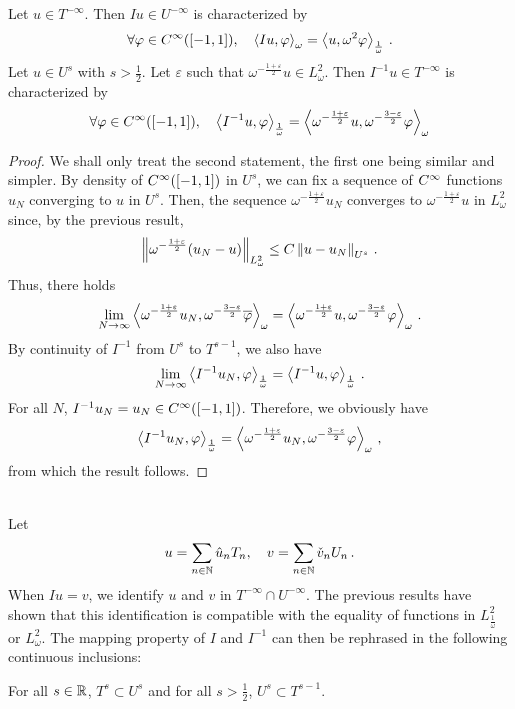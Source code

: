 \documentclass[a4paper]{article}
\begin{document}
\begin{Cor}
	Let $u \in T^{-\infty}$. Then $Iu \in U^{-\infty}$ is characterized by
	\[\forall \varphi\in C^{\infty}([-1,1]),\quad \left\langle Iu,\varphi\right\rangle_\omega = \left\langle u,\omega^2 \varphi\right\rangle_\frac{1}{\omega}\,.\]
	Let $u \in U^s$ with $s > \frac{1}{2}$. Let $\varepsilon$ such that $\omega^{-\frac{1+ \varepsilon}{2} }u \in L^2_\omega$. Then $I^{-1}u \in T^{-\infty}$ is characterized by 
	\[\forall \varphi\in C^{\infty}([-1,1]), \quad \left\langle I^{-1}u,\varphi\right\rangle_\frac{1}{\omega}=\left\langle {\omega^{-\frac{1+ \varepsilon}{2} }u},{\omega^{-\frac{3- \varepsilon}{2} } \varphi}\right\rangle_\omega \]
\end{Cor}
\begin{proof}
	We shall only treat the second statement, the first one being similar and simpler. By density of $C^{\infty}([-1,1])$ in $U^s$, we can fix a sequence of $C^{\infty}$ functions $u_N$ converging to $u$ in $U^s$. Then, the sequence $\omega^{-\frac{1 + \varepsilon}{2}}u_N$ converges to $\omega^{-\frac{1 + \varepsilon}{2}}u$ in $L^2_\omega$ since, by the previous result,
	\[\left\|\omega^{-\frac{1+ \varepsilon}{2}}(u_N - u)\right\|_{L^2_\omega} \leq C \left\|u - u_N\right\|_{U^{s}}\,.\]
	Thus, there holds 
	\[\lim_{N \to \infty} \left\langle {\omega^{-\frac{1+ \varepsilon}{2} }u_N},{\omega^{-\frac{3- \varepsilon}{2} }\overline \varphi}\right\rangle_\omega = \left\langle {\omega^{-\frac{1+ \varepsilon}{2} }u},{\omega^{-\frac{3- \varepsilon}{2} } \varphi}\right\rangle_\omega\,.\]
	By continuity of $I^{-1}$ from $U^s$ to $T^{s - 1}$, we also have 
	\[\lim_{N \to \infty}\left\langle I^{-1} u_N,\varphi\right\rangle_{\frac{1}{\omega}} = \left\langle I^{-1} u,\varphi\right\rangle_{\frac{1}{\omega}}\,. \]
	For all $N$, $I^{-1}u_N = u_N \in C^{\infty}([-1,1])$. Therefore, we obviously have
	\[\left\langle I^{-1}u_N,\varphi\right\rangle_{\frac{1}{\omega}} =  \left\langle {\omega^{-\frac{1+ \varepsilon}{2} }u_N},{\omega^{-\frac{3- \varepsilon}{2} } \varphi}\right\rangle_\omega\,,\] 
	from which the result follows.
\end{proof}
\noindent{}\\
\noindent Let
\[u = \sum_{n \in \mathbb{N} } \hat{u}_n T_n, \quad v = \sum_{n \in \mathbb{N}} \check{v}_n U_n\,.\]
When $Iu = v$, we identify $u$ and $v$ in $T^{-\infty} \cap U^{-\infty}$. The previous results have shown that this identification is compatible with the equality of functions in $L^2_\frac{1}{\omega}$ or $L^2_\omega$. The mapping property of $I$ and $I^{-1}$ can then be rephrased in the following continuous inclusions:
\begin{Cor}
	For all $s \in \mathbb{R}$, $T^s \subset U^s$ and for all $s > \frac{1}{2}$, $U^s \subset T^{s-1}$.    
\end{Cor}
\end{document}
